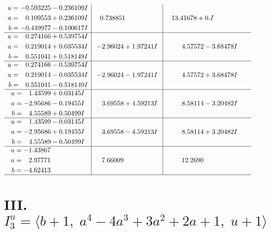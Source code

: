 \documentclass[1p]{elsarticle_modified}
\theoremstyle{definition}
\begin{document}
$$\begin{array}{c|c|c}
\begin{aligned}
u &= -0.593225 - 0.236109 I \\
a &= \phantom{-}0.109553 + 0.236109 I \\
b &= -0.449977 - 0.100617 I\end{aligned}
 & \phantom{-}0.738851\phantom{ +0.000000I} & \phantom{-}13.41678 + 0. I\phantom{ +0.000000I} \\ \hline\begin{aligned}
u &= \phantom{-}0.274166 + 0.539754 I \\
a &= \phantom{-}0.219014 + 0.035534 I \\
b &= \phantom{-}0.551041 + 0.518149 I\end{aligned}
 & -2.96024 + 1.97241 I & \phantom{-}4.57572 - 3.68478 I \\ \hline\begin{aligned}
u &= \phantom{-}0.274166 - 0.539754 I \\
a &= \phantom{-}0.219014 - 0.035534 I \\
b &= \phantom{-}0.551041 - 0.518149 I\end{aligned}
 & -2.96024 - 1.97241 I & \phantom{-}4.57572 + 3.68478 I \\ \hline\begin{aligned}
u &= \phantom{-}1.43599 + 0.03145 I \\
a &= -2.95686 - 0.19455 I \\
b &= \phantom{-}4.55589 + 0.50499 I\end{aligned}
 & \phantom{-}3.69558 + 4.59213 I & \phantom{-}8.58114 - 3.20482 I \\ \hline\begin{aligned}
u &= \phantom{-}1.43599 - 0.03145 I \\
a &= -2.95686 + 0.19455 I \\
b &= \phantom{-}4.55589 - 0.50499 I\end{aligned}
 & \phantom{-}3.69558 - 4.59213 I & \phantom{-}8.58114 + 3.20482 I \\ \hline\begin{aligned}
u &= -1.43867\phantom{ +0.000000I} \\
a &= \phantom{-}2.97771\phantom{ +0.000000I} \\
b &= -4.62413\phantom{ +0.000000I}\end{aligned}
 & \phantom{-}7.66009\phantom{ +0.000000I} & \phantom{-}12.2690\phantom{ +0.000000I}\\
 \hline 
 \end{array}$$\newpage\newpage\renewcommand{\arraystretch}{1}
\centering \section*{III. $I^u_{3}= \langle b+1,\;a^4-4 a^3+3 a^2+2 a+1,\;u+1 \rangle$}
\end{document}
